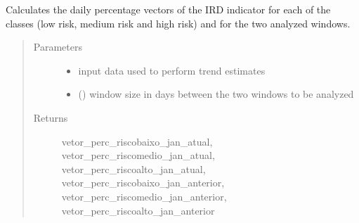 \documentclass[letterpaper,10pt,english]{sphinxmanual}
\begin{document}
\begin{fulllineitems}
\label{\detokenize{algorithms:algorithms.eti.eti.calc_vector_perc_daily_ird}}
\sphinxAtStartPar
Calculates the daily percentage vectors of the IRD indicator for each of the classes (low risk, medium risk and
high risk) and for the two analyzed windows.
\begin{quote}\begin{description}
\item[{Parameters}] \leavevmode\begin{itemize}
\item {} 
\sphinxAtStartPar
{} \textendash{} input data used to perform trend estimates

\item {} 
\sphinxAtStartPar
{} () \textendash{} window size in days between the two windows to be analyzed

\end{itemize}

\item[{Returns}] \leavevmode
\sphinxAtStartPar
vetor\_perc\_riscobaixo\_jan\_atual, vetor\_perc\_riscomedio\_jan\_atual, vetor\_perc\_riscoalto\_jan\_atual,
vetor\_perc\_riscobaixo\_jan\_anterior, vetor\_perc\_riscomedio\_jan\_anterior, vetor\_perc\_riscoalto\_jan\_anterior

\end{description}\end{quote}

\end{fulllineitems}

\end{document}
